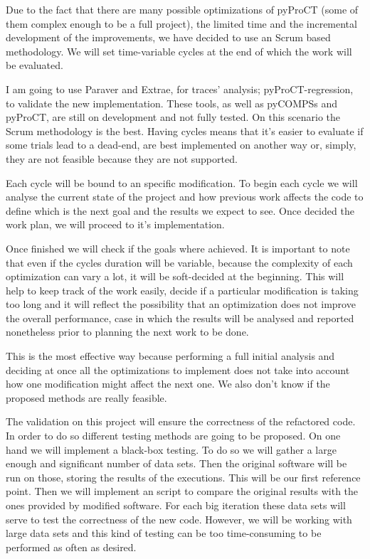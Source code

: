 Due to the fact that there are many possible optimizations of pyProCT (some of them complex enough to be a full project), the limited time and the incremental development of the improvements, we have decided to use an Scrum based methodology. We will set time-variable cycles at the end of which the work will be evaluated. 

I am going to use Paraver and Extrae, for traces' analysis; pyProCT-regression, to validate the new implementation. These tools, as well as pyCOMPSs and pyProCT, are still on development and not fully tested. On this scenario the Scrum methodology is the best. Having cycles means that it's easier to evaluate if some trials lead to a dead-end, are best implemented on another way or, simply, they are not feasible because they are not supported.

Each cycle will be bound to an specific modification. To begin each cycle we will analyse the current state of the project and how previous work affects the code to define which is the next goal and the results we expect to see. Once decided the work plan, we will proceed to it's implementation. 

Once finished we will check if the goals where achieved. It is important to note that even if the cycles duration will be variable, because the complexity of each optimization can vary a lot, it will be soft-decided at the beginning. This will help to keep track of the work easily, decide if a particular modification is taking too long and it will reflect the possibility that an optimization does not improve the overall performance, case in which the results will be analysed and reported nonetheless prior to planning the next work to be done.

This is the most effective way because performing a full initial analysis and deciding at once all the optimizations to implement does not take into account how one modification might affect the next one. We also don't know if the proposed methods are really feasible.

The validation on this project will ensure the correctness of the refactored code. In order to do so different testing methods are going to be proposed. On one hand we will implement a black-box testing. To do so we will gather a large enough and significant number of data sets. Then the original software will be run on those, storing the results of the executions. This will be our first reference point. Then we will implement an script to compare the original results with the ones provided by modified software. For each big iteration these data sets will serve to test the correctness of the new code. However, we will be working with large data sets and this kind of testing can be too time-consuming to be performed as often as desired. 

